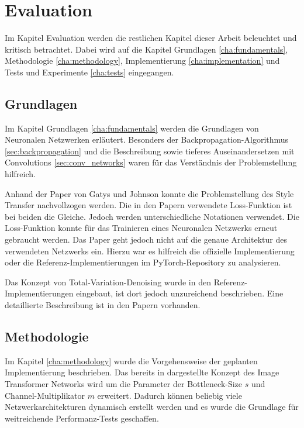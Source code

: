 \chapter{Evaluation}

Im Kapitel Evaluation werden die restlichen Kapitel dieser Arbeit beleuchtet und kritisch betrachtet. Dabei wird auf die Kapitel Grundlagen \ref{cha:fundamentals}, Methodologie \ref{cha:methodology}, Implementierung \ref{cha:implementation} und Tests und Experimente \ref{cha:tests} eingegangen.

\section{Grundlagen}

Im Kapitel Grundlagen \ref{cha:fundamentals} werden die Grundlagen von Neuronalen Netzwerken erläutert. Besonders der Backpropagation-Algorithmus \ref{sec:backpropagation} und die Beschreibung sowie tieferes Auseinandersetzen mit Convolutions \ref{sec:conv_networks} waren für das Verständnis der Problemstellung hilfreich.

Anhand der Paper von Gatys \cite{DBLP:journals/corr/GatysEB15a} und Johnson \cite{DBLP:journals/corr/JohnsonAL16} konnte die Problemstellung des Style Transfer nachvollzogen werden. Die in den Papern verwendete Loss-Funktion ist bei beiden die Gleiche. Jedoch werden unterschiedliche Notationen verwendet. Die Loss-Funktion konnte für das Trainieren eines Neuronalen Netzwerks erneut gebraucht werden. Das Paper \cite{DBLP:journals/corr/JohnsonAL16} geht jedoch nicht auf die genaue Architektur des verwendeten Netzwerks ein. Hierzu war es hilfreich die offizielle Implementierung \cite{Johnson2016} oder die Referenz-Implementierungen im PyTorch-Repository \cite{OnlineToturialNeuralStylePyTorch} zu analysieren.

Das Konzept von Total-Variation-Denoising wurde in den Referenz-Implementierungen eingebaut, ist dort jedoch unzureichend beschrieben. Eine detaillierte Beschreibung ist in den Papern \cite{RUDIN1992259, DBLP:journals/corr/EstrelaMS16} vorhanden.

\section{Methodologie}

Im Kapitel \ref{cha:methodology} wurde die Vorgehensweise der geplanten Implementierung beschrieben. Das bereits in \cite{DBLP:journals/corr/JohnsonAL16} dargestellte Konzept des Image Transformer Networks wird um die Parameter der Bottleneck-Size $ s $ und Channel-Multiplikator $ m $ erweitert. Dadurch können beliebig viele Netzwerkarchitekturen dynamisch erstellt werden und es wurde die Grundlage für weitreichende Performanz-Tests geschaffen.

